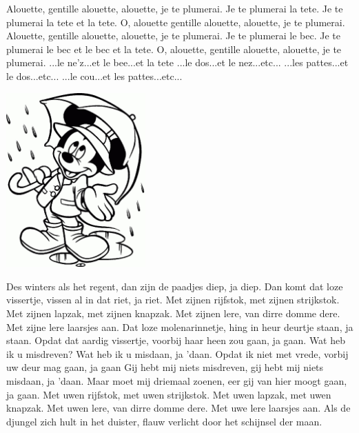 \documentclass{article}
\begin{document}
\begin{songs}{}
\beginverse
Alouette, gentille alouette, alouette, je te plumerai.
Je te plumerai la tete. 
Je te plumerai la tete et la tete.
O, alouette gentille alouette, alouette, je te plumerai.
\endverse
\beginverse
Alouette, gentille alouette, alouette, je te plumerai.
Je te plumerai le bec.
Je te plumerai le bec et le bec et la tete.
O, alouette, gentille alouette, alouette, je te plumerai.
\endverse
\beginverse
...le ne'z...et le bee...et la tete
\endverse
\beginverse
...le dos...et le nez...etc...
\endverse
\beginverse
...les pattes...et le dos...etc...
\endverse
\beginverse
 ...le cou...et les pattes...etc...
\endverse
\endsong
\begin{intersong}
    \includegraphics[width=0.4\textwidth]{deswintersalshetregent}
\end{intersong}
\beginverse
Des winters als het regent, dan zijn de paadjes diep, ja diep.
Dan komt dat loze vissertje, vissen al in dat riet, ja riet.
\endverse
\beginchorus
Met zijnen rijfstok, met zijnen strijkstok.
Met zijnen lapzak, met zijnen knapzak.
Met zijnen lere, van dirre domme dere.
Met zijne lere laarsjes aan. 
\endchorus
\beginverse
Dat loze molenarinnetje, hing in heur deurtje staan, ja staan.
Opdat dat aardig vissertje, voorbij haar heen zou gaan, ja gaan.
\endverse
\beginverse
Wat heb ik u misdreven? Wat heb ik u misdaan, ja 'daan.
Opdat ik niet met vrede, vorbij uw deur mag gaan, ja gaan
\endverse
\beginverse
Gij hebt mij niets misdreven, gij hebt mij niets misdaan, ja 'daan.
Maar moet mij driemaal zoenen, eer gij van hier moogt gaan, ja gaan.
\endverse
\beginchorus
Met uwen rijfstok, met uwen strijkstok.
Met uwen lapzak, met uwen knapzak.
Met uwen lere, van dirre domme dere.
Met uwe lere laarsjes aan. 
\endchorus
\endsong
{}
\beginverse*
Als de djungel zich hult in het duister, flauw verlicht door het schijnsel der maan.

\end{songs}
\end{document}
